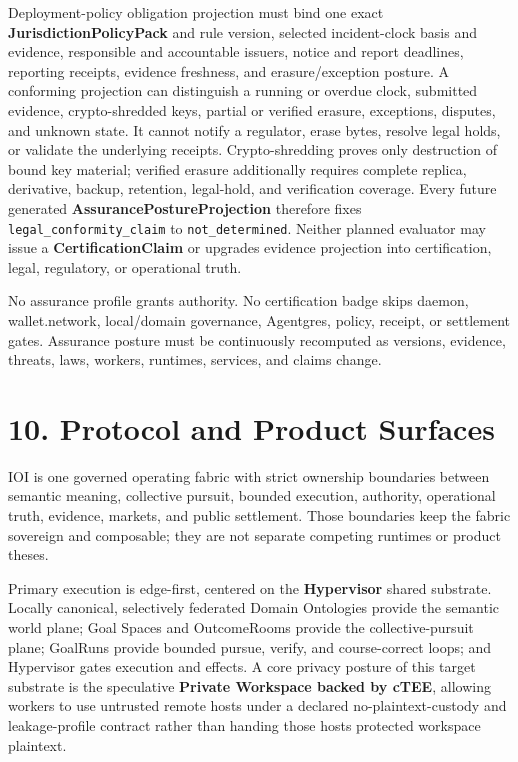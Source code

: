 \documentclass[
  11pt,
]{article}
\begin{document}
Deployment-policy obligation projection must bind one exact
\textbf{JurisdictionPolicyPack} and rule version, selected incident-clock basis
and evidence, responsible and accountable issuers, notice and report
deadlines, reporting receipts, evidence freshness, and erasure/exception
posture. A conforming projection can distinguish a running or overdue clock, submitted evidence,
crypto-shredded keys, partial or verified erasure, exceptions, disputes, and
unknown state. It cannot notify a regulator, erase bytes, resolve legal holds,
or validate the underlying receipts. Crypto-shredding proves only destruction
of bound key material; verified erasure additionally requires complete
replica, derivative, backup, retention, legal-hold, and verification coverage.
Every future generated \textbf{AssurancePostureProjection} therefore fixes
\texttt{legal\_conformity\_claim} to
\texttt{not\_determined}. Neither planned evaluator may issue a
\textbf{CertificationClaim} or upgrades evidence projection into
certification, legal, regulatory, or operational truth.

No assurance profile grants authority. No certification badge skips daemon,
wallet.network, local/domain governance, Agentgres, policy, receipt, or
settlement gates. Assurance posture must be continuously recomputed as
versions, evidence, threats, laws, workers, runtimes, services, and claims
change.

\hypertarget{protocol-surfaces-ecosystem-roadmap}{%
\section{10. Protocol and Product
Surfaces}\label{protocol-surfaces-ecosystem-roadmap}}

IOI is one governed operating fabric with strict ownership boundaries
between semantic meaning, collective pursuit, bounded execution,
authority, operational truth, evidence, markets, and public settlement.
Those boundaries keep the fabric sovereign and composable; they are not
separate competing runtimes or product theses.

Primary execution is edge-first, centered on the \textbf{Hypervisor}
shared substrate. Locally canonical, selectively federated Domain Ontologies provide the semantic world
plane; Goal Spaces and OutcomeRooms provide the collective-pursuit plane;
GoalRuns provide bounded pursue, verify, and course-correct loops; and
Hypervisor gates execution and effects. A core privacy posture of this
target substrate is the speculative \textbf{Private Workspace backed by cTEE}, allowing
workers to use untrusted remote hosts under a declared no-plaintext-custody
and leakage-profile contract rather than handing those hosts protected
workspace plaintext.
\end{document}
